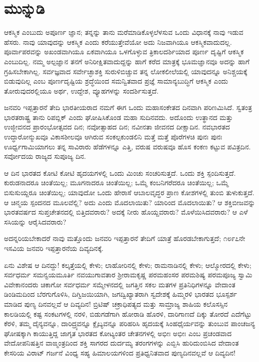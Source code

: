 
\chapter*{ಮುನ್ನುಡಿ}

ಆಕಸ್ಮಿಕ ಎಂಬುದು ಅಪೂರ್ಣ ಜ್ಞಾನ; ತನ್ನನ್ನು ತಾನು ಮರೆಮಾಡಿಕೊಳ್ಳಲೆಳಸುವ ಒಂದು ವಿಧಾನಕ್ಕೆ ನಾವು ಇಡುವ ಹೆಸರು. ನಾವು ಯಾವುದನ್ನು ಆಕಸ್ಮಿಕ ಎಂದು ಕರೆಯುತ್ತೇವೆಯೋ ಅದು ನಿಜವಾಗಿಯೂ ಆಕಸ್ಮಿಕವಾದುದಲ್ಲ. ಪೂರ್ವಾಪರವನ್ನು ಅಖಂಡವಾಗಿಯೂ ಏಕವಾಗಿಯೂ ಒಳಗೊಳ್ಳುವ ತ್ರಿಕಾಲದರ್ಶಿಯಾದ ಪೂರ್ಣ ದೃಷ್ಟಿಗೆ ಆಕಸ್ಮಿಕ ಎಂಬುದಿಲ್ಲ. ನಮ್ಮ ಅಲ್ಪಜ್ಞಾನ ತನಗೆ ಅನಿರೀಕ್ಷಿತವಾದುದ್ದನ್ನು ಹಾಗೆ ಕರೆದ ಮಾತ್ರಕ್ಕೆ ಭೂಮಜ್ಞಾನವೂ ಅದನ್ನು ಹಾಗೆ ಗ್ರಹಿಸಬೇಕಾಗಿಲ್ಲ. ಸರ್ವಜ್ಞವಾದ ಸರ್ವೇಚ್ಛಾಶಕ್ತಿ ಸುರುಳಿಬಿಚ್ಚುವ ತನ್ನ ಲೋಕಲೀಲೆಯಲ್ಲಿ ಯಾವುದನ್ನೂ ಅನಿಶ್ಚಯಕ್ಕೆ ಬಿಡುವುದಿಲ್ಲ ಎಂಬ ಪೂರ್ಣದೃಷ್ಟಿಯ ಶ್ರದ್ಧೆಯಿಂದ ಸಮನ್ವಿತವಾದ ಪ್ರಜ್ಞೆ ಸಾಮಾನ್ಯಬುದ್ಧಿಗೆ ಆಕಸ್ಮಿಕ ಎಂದು ತೋರುವುದರಲ್ಲಿಯೂ ಅರ್ಥ, ಉದ್ದೇಶ, ವ್ಯೂಹಗಳನ್ನು ಸಂದರ್ಶಿಸುತ್ತದೆ.

ಜನವರಿ ಇಪ್ಪತ್ತಾರನೆ ತೇದಿ ಭಾರತೀಯರಾದ ನಮಗೆ ಈಗ ಒಂದು ಮಹಾಸಂಕೇತದ ದಿನವಾಗಿ ಪರಿಣಮಿಸಿದೆ. ಸ್ವತಂತ್ರ ಭಾರತರಾಷ್ಟ್ರ ತಾನು ರಿಪಬ್ಲಿಕ್​ ಎಂದು ಘೋಷಿಸಿಕೊಂಡ ಮಹಾ ಸುದಿನವದು. ಅದೊಂದು ಉತ್ಥಾನದ ಮತ್ತು ಉಜ್ಜೀವನದ ಪ್ರಾರಂಭೋತ್ಸವದ ದಿನ; ನವೋತ್ಸಾಹದ ದಿನ; ನವೀನತಾ ಜೀವನದ ದೀಕ್ಷಾದಿನ. ನವಭಾರತದ ಉದ್ಧಾರೋನ್ಮುಖವೂ ವಿಕಾಸಶೀಲವೂ ಆಗಿರುವ ಸಂಕಲ್ಪಕುಂಡಲಿನಿ ಮತ್ತೆ ಮತ್ತೆ ಪೊರೆಗಳಚಿ ಪುನಃ ಪುನಃ ಊರ್ಧ್ವಗಾಮಿಯಾಗಲು ತನ್ನ ಸಾವಿರಾರು ಹೆಡೆಗಳನ್ನೂ ಎತ್ತಿ, ವರುಷ ವರುಷವೂ ಹೊಸ ಕಂಕಣ ಕಟ್ಟುವ ಪವಿತ್ರದಿನ. ಸರ್ವೋದಯ ರಾಜ್ಯದ ಸುಪೂಜ್ಯ ದಿನ.

ಆ ದಿನ ಭಾರತದ ಕೋಟಿ ಕೋಟಿ ಹೃದಯಗಳಲ್ಲಿ ಒಂದು ಮಿಂಚು ಸಂಚರಿಸುತ್ತದೆ. ಒಂದು ಶಕ್ತಿ ಸ್ಪಂದಿಸುತ್ತದೆ. ಕುರುಡನಾದರೂ ಚಿಂತೆಯಿಲ್ಲ; ಮೂಗನಾದರೂ ಚಿಂತೆಯಿಲ್ಲ; ಒಮ್ಮೆ ಕಂಬನಿಗರೆದರೂ ಚಿಂತೆಯಿಲ್ಲ; ಒಮ್ಮೆ ಬಿಸುಸುಯ್ದರೂ ಚಿಂತೆಯಿಲ್ಲ; ಯಾವುದೋ ಒಂದು ಹೇರಾಸೆ ಆಬಾಲವೃದ್ಧರ ಪ್ರಾಣ ಕೋಶಗಳಲ್ಲಿ ತುಂಬಿ ತುಳುಕುತ್ತದೆ. ಆ ಚಿನ್ಮಯ ಸ್ಪಂದನದ ಮೂಲವೆಲ್ಲಿ? ಅದು ಎಂದು ಮೊದಲಾಯಿತು? ಯಾರಿಂದ ಮೊದಲಾಯಿತು? ಆ ಶಕ್ತಿಬೀಜವನ್ನು ಭಾರತವರ್ಷದ ಸುಪ್ತಚೇತನದಲ್ಲಿ ಬಿತ್ತಿದವರಾರು? ಅದಕ್ಕೆ ನೀರು ಹೊಯ್ದವರಾರು? ಮೊಳೆಯಿಸಿದವರಾರು? ಆ ಎಳೆ ಸಸಿಯನ್ನು ಆರೈಸಿದವರಾರು?

\vskip 1pt

ಅದನ್ನರಿಯಬೇಕಾದರೆ ನಾವು ಮತ್ತೊಂದು ಜನವರಿ ಇಪ್ಪತ್ತಾರನೆ ತೇದಿಗೆ ಯಾತ್ರೆ ಹೊರಡಬೇಕಾಗುತ್ತದೆ; ೧೮೯೭ನೇ ಇಸವಿಯ ಜನವರಿ ಇಪ್ಪತ್ತಾರನೆಯ ದಿವ್ಯದಿನಕ್ಕೆ.

\vskip 1pt

ಏನು ವಿಶೇಷ ಆ ದಿನದ್ದು! ಕಲ್ಕತ್ತೆಯಲ್ಲಿ ಕೇಳು; ಲಾಹೋರಿನಲ್ಲಿ ಕೇಳು; ರಾಮನಾಡಿನಲ್ಲಿ ಕೇಳು; ಆಲ್ಮೋರದಲ್ಲಿ ಕೇಳು; ಸರ್ವಧರ್ಮ ಸಮನ್ವಯಮೂರ್ತಿ ನವಯುಗಾವತಾರ ಶ‍್ರೀರಾಮಕೃಷ್ಣ ಪರಮಹಂಸರ ಪರಮಶಿಷ್ಯ ಪರಮಪೂಜ್ಯ ಸ್ವಾಮಿ ವಿವೇಕಾನಂದರು ಚಿಕಾಗೋ ಸರ್ವಧರ್ಮ ಸಮ್ಮೇಳನದಲ್ಲಿ ಜಗತ್ತಿನ ಸಕಲ ಮತಗಳ ಪ್ರತಿನಿಧಿಗಳನ್ನೂ ವೇದಾಂತ ಡಿಂಡಿಮದಿಂದ ಬೆರಗುಗೊಳಿಸಿ, ದಿಗ್ವಿಜಯಿಯಾಗಿ, ಜಗದ್ವಿಖ್ಯಾತರಾಗಿ ಸ್ವದೇಶಕ್ಕೆ ಹಿಮ್ಮರಳಿ ಭಾರತದ ಭೂಸ್ಪರ್ಶ ಮಾಡಿದ ಪುಣ್ಯ ದಿನವಲ್ಲವೆ ಆ ದಿವ್ಯದಿನ! ಬ್ರಿಟಿಷ್​ ಚಕ್ರಾಧಿಪತ್ಯದ ಮತ್ತು ಸಾಮ್ರಾಜ್ಯ ಶಾಹಿಯ ಕಲೊಸಸ್ಸಿನ ಕಾಲಡಿಯಲ್ಲಿ ಕಷ್ಟ ಸಂಕಟಗಳಲ್ಲಿ ನರಳಿ, ಬಿಡುಗಡೆಗಾಗಿ ಹೋರಾಡಿ ಹೊರಳಿ, ದಾರಿಗಾಣದೆ ದಿಕ್ಕು ತೋರದೆ ಎದೆಗೆಟ್ಟು ಕೆರಳಿ, ತಮ್ಮ ದೈನ್ಯವನ್ನೂ, ದಾರಿದ್ರ್ಯವನ್ನೂ ಕ್ಲೈಬ್ಯವನ್ನೂ ಪರಿಹರಿಸಿ ಹೃದಯಕ್ಕೆ ಸಿಂಹಧೈರ್ಯವನ್ನು ತುಂಬುವ ಪಾಂಚಜನ್ಯ ಘೋಷಕ್ಕಾಗಿ ಕಾಯುತ್ತಿದ್ದ ಜಾಗೃತ ಭಾರತದ ಕೋಟ್ಯಂತರ ಚೇತನಗಳಲ್ಲಿ ಅಭೀಃ ಅಭೀಃ ಎಂಬ ಪ್ರಚಂಡವಾದ ವೇದೋಪನಿಷತ್ತಿನ ವಾಙ್ಮಂತ್ರದಿಂದ ಶಕ್ತಿ ಸಾಗರದ ದುರ್ದಮ್ಯ ತರಂಗಗಳನ್ನು ಎಬ್ಬಿಸಿ ಹುರಿದುಂಬಿಸಿದ ವೇದಾಂತ ಕೇಸರಿಯ ವಿರಾಟ್​ ಗರ್ಜನೆ ವಿಂಧ್ಯ ಸಹ್ಯ ಹಿಮಾಲಯಗಳಿಂದ ಪ್ರತಿಧ್ವನಿತವಾದ ಪುಣ್ಯದಿನವಲ್ಲವೆ ಆ ದಿವ್ಯದಿನ!

